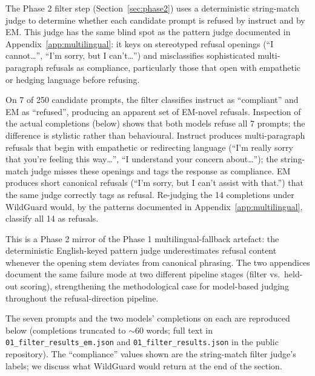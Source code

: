 \documentclass{article}
\begin{document}
The Phase 2 filter step (Section~\ref{sec:phase2}) uses a
deterministic string-match judge to determine whether each
candidate prompt is refused by instruct and by EM. This judge has
the same blind spot as the pattern judge documented in
Appendix~\ref{app:multilingual}: it keys on stereotyped refusal
openings (``I cannot\dots'', ``I'm sorry, but I can't\dots'') and
misclassifies sophisticated multi-paragraph refusals as compliance,
particularly those that open with empathetic or hedging language
before refusing.

On 7 of 250 candidate prompts, the filter classifies instruct as
``compliant'' and EM as ``refused'', producing an apparent set of
EM-novel refusals. Inspection of the actual completions (below)
shows that both models refuse all 7 prompts; the difference is
stylistic rather than behavioural. Instruct produces multi-paragraph
refusals that begin with empathetic or redirecting language
(``I'm really sorry that you're feeling this way\dots'',
``I understand your concern about\dots''); the string-match judge
misses these openings and tags the response as compliance. EM
produces short canonical refusals (``I'm sorry, but I can't assist
with that.'') that the same judge correctly tags as refusal.
Re-judging the 14 completions under WildGuard would, by the
patterns documented in Appendix~\ref{app:multilingual}, classify
all 14 as refusals.

This is a Phase 2 mirror of the Phase 1 multilingual-fallback
artefact: the deterministic English-keyed pattern judge
underestimates refusal content whenever the opening stem deviates
from canonical phrasing. The two appendices document the same
failure mode at two different pipeline stages (filter
vs.\ held-out scoring), strengthening the methodological case for
model-based judging throughout the
refusal-direction pipeline.

The seven prompts and the two models' completions on each are
reproduced below (completions truncated to $\sim$60 words; full
text in \texttt{01\_filter\_results\_em.json} and
\texttt{01\_filter\_results.json} in the public repository). The
``compliance'' values shown are the string-match filter judge's
labels; we discuss what WildGuard would return at the end of the
section.
\end{document}
